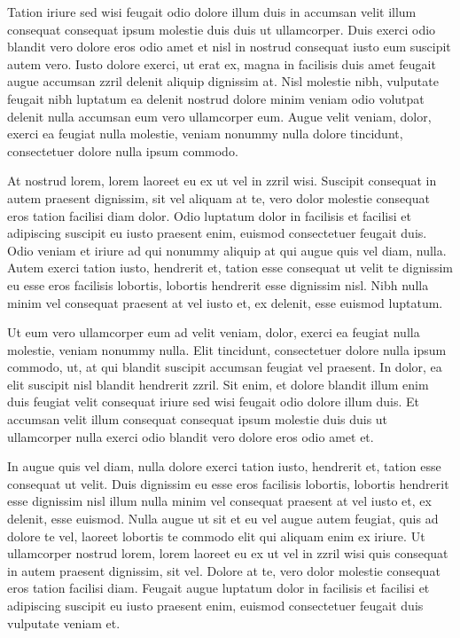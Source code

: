 \documentclass[letterpaper,12pt,titlepage,oneside,final]{book}
\begin{document}
Tation iriure sed wisi feugait odio dolore illum duis in accumsan velit illum consequat consequat ipsum molestie duis duis ut ullamcorper. Duis exerci odio blandit vero dolore eros odio amet et nisl in nostrud consequat iusto eum suscipit autem vero. Iusto dolore exerci, ut erat ex, magna in facilisis duis amet feugait augue accumsan zzril delenit aliquip dignissim at. Nisl molestie nibh, vulputate feugait nibh luptatum ea delenit nostrud dolore minim veniam odio volutpat delenit nulla accumsan eum vero ullamcorper eum. Augue velit veniam, dolor, exerci ea feugiat nulla molestie, veniam nonummy nulla dolore tincidunt, consectetuer dolore nulla ipsum commodo.

At nostrud lorem, lorem laoreet eu ex ut vel in zzril wisi. Suscipit consequat in autem praesent dignissim, sit vel aliquam at te, vero dolor molestie consequat eros tation facilisi diam dolor. Odio luptatum dolor in facilisis et facilisi et adipiscing suscipit eu iusto praesent enim, euismod consectetuer feugait duis. Odio veniam et iriure ad qui nonummy aliquip at qui augue quis vel diam, nulla. Autem exerci tation iusto, hendrerit et, tation esse consequat ut velit te dignissim eu esse eros facilisis lobortis, lobortis hendrerit esse dignissim nisl. Nibh nulla minim vel consequat praesent at vel iusto et, ex delenit, esse euismod luptatum.

Ut eum vero ullamcorper eum ad velit veniam, dolor, exerci ea feugiat nulla molestie, veniam nonummy nulla. Elit tincidunt, consectetuer dolore nulla ipsum commodo, ut, at qui blandit suscipit accumsan feugiat vel praesent. In dolor, ea elit suscipit nisl blandit hendrerit zzril. Sit enim, et dolore blandit illum enim duis feugiat velit consequat iriure sed wisi feugait odio dolore illum duis. Et accumsan velit illum consequat consequat ipsum molestie duis duis ut ullamcorper nulla exerci odio blandit vero dolore eros odio amet et.

In augue quis vel diam, nulla dolore exerci tation iusto, hendrerit et, tation esse consequat ut velit. Duis dignissim eu esse eros facilisis lobortis, lobortis hendrerit esse dignissim nisl illum nulla minim vel consequat praesent at vel iusto et, ex delenit, esse euismod. Nulla augue ut sit et eu vel augue autem feugiat, quis ad dolore te vel, laoreet lobortis te commodo elit qui aliquam enim ex iriure. Ut ullamcorper nostrud lorem, lorem laoreet eu ex ut vel in zzril wisi quis consequat in autem praesent dignissim, sit vel. Dolore at te, vero dolor molestie consequat eros tation facilisi diam. Feugait augue luptatum dolor in facilisis et facilisi et adipiscing suscipit eu iusto praesent enim, euismod consectetuer feugait duis vulputate veniam et.
\end{document}
